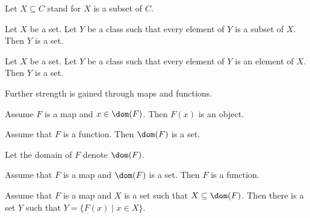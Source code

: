 \documentclass[11pt]{article}
\begin{document}
\begin{forthel}
Let $X \subseteq C$ stand for $X$ is a subset of $C$. 

\begin{axiom}[title = Powerset] Let $X$ be a set. Let $Y$ be a class such that
every element of $Y$ is a subset of $X$. Then $Y$ is a set.
\end{axiom}

\begin{axiom}[title = Separation]
Let $X$ be a set. Let $Y$ be a class such that every element
of $Y$ is an element of $X$.
Then $Y$ is a set.
\end{axiom}

\end{forthel}
Further strength is gained through maps and functions.

\begin{forthel}

\begin{proposition}
Assume $F$ is a map and $x \in \dom(F)$.
Then $F(x)$ is an object.
\end{proposition}

\begin{axiom}
Assume that $F$ is a function. Then $\dom(F)$ is a set.
\end{axiom}
Let the domain of $F$ denote $\dom(F)$.

\begin{axiom}
Assume that $F$ is a map and $\dom(F)$ is a set.
Then $F$ is a function.
\end{axiom}

\begin{axiom}[title = Replacement]
Assume that $F$ is a map and $X$ is a set such that $X \subseteq \dom(F)$.
Then there is a set $Y$ such that $Y = \{F(x) \mid x \in X\}$.
\end{axiom}

\end{forthel}
\end{document}
